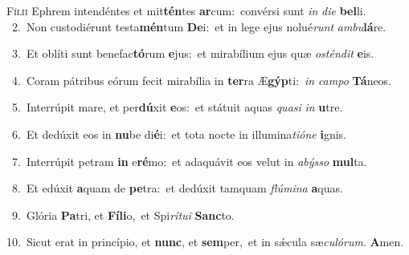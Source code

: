 \lettrine{\initial\textcolor{\initialcolor}{F}}{ílii} Ephrem intendéntes et mit\-\textbf{tén}\-tes \textbf{ar}\-cum:~\star convérsi sunt \textit{in} \textit{di}\-\textit{e} \textbf{bel}\-li.\\
{\numbfont\textcolor{\numbcolor}{~2.}}~Non custodiérunt testa\-\textbf{mén}\-tum \textbf{De}\-i:~\star et in lege ejus nolué\textit{runt} \textit{am}\-\textit{bu}\textbf{lá}re.\par
{\numbfont\textcolor{\numbcolor}{~3.}}~Et oblíti sunt benefac\-\textbf{tó}\-rum \textbf{e}\-jus:~\star et mirabílium ejus quæ \textit{os}\-\textit{tén}\textit{dit} \textbf{e}\-is.\par
{\numbfont\textcolor{\numbcolor}{~4.}}~Coram pátribus eórum fecit mirabília in \textbf{ter}\-ra Æ\-\textbf{gýp}\-ti:~\star \textit{in} \textit{cam}\-\textit{po} \textbf{Tá}\-neos.\par
{\numbfont\textcolor{\numbcolor}{~5.}}~Interrúpit mare, et per\-\textbf{dú}\-xit \textbf{e}\-os:~\star et státuit aquas \textit{qua}\-\textit{si} \textit{in} \textbf{u}\-tre.\par
{\numbfont\textcolor{\numbcolor}{~6.}}~Et dedúxit eos in \textbf{nu}\-be di\-\textbf{é}\-i:~\star et tota nocte in illumina\-\textit{ti}\-\textit{ó}\textit{ne} \textbf{i}\-gnis.\par
{\numbfont\textcolor{\numbcolor}{~7.}}~Interrúpit petram \textbf{in} e\-\textbf{ré}\-mo:~\star et adaquávit eos velut in \textit{a}\-\textit{býs}\textit{so} \textbf{mul}\-ta.\par
{\numbfont\textcolor{\numbcolor}{~8.}}~Et edúxit \textbf{a}\-quam de \textbf{pe}\-tra:~\star et dedúxit tamquam \textit{flú}\-\textit{mi}\textit{na} \textbf{a}\-quas.\par
{\numbfont\textcolor{\numbcolor}{~9.}}~Glória \textbf{Pa}\-tri, et \textbf{Fí}\-\textbf{li}o,~\star et Spi\-\textit{rí}\-\textit{tu}\textit{i} \textbf{Sanc}\-to.\par
{\numbfont\textcolor{\numbcolor}{10.}}~Sicut erat in princípio, et \textbf{nunc}\-, et \textbf{sem}\-per,~\star et in sǽcula sæ\-\textit{cu}\-\textit{ló}\textit{rum}. \textbf{A}\-men.\par
